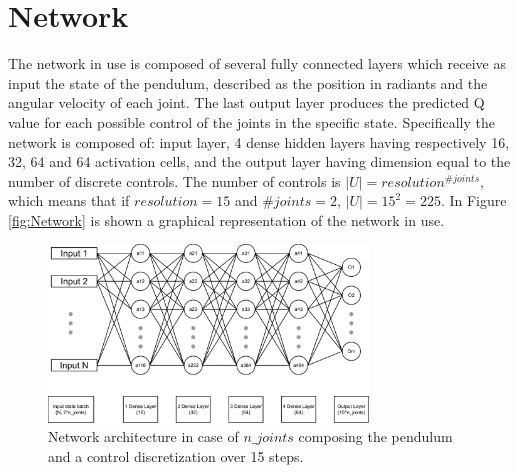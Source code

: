 \documentclass[twocolumn, a4paper]{article}
\begin{document}
\section{Network}
The network in use is composed of several fully connected layers which receive
as input the state of the pendulum, described as the position in
radiants and the angular velocity of each joint.
The last output layer produces the predicted Q value for each possible control
of the joints in the specific state.
Specifically the network is composed of: input layer, 4 dense hidden layers
having respectively 16, 32, 64 and 64 activation cells, and the output layer
having dimension equal to the number of discrete controls.
The number of controls is \(|U|=resolution^{\#joints}\), which
means that if \(resolution=15\) and \(\#joints=2\), \(|U|=15^{2}=225\).
In Figure \ref{fig:Network} is shown a graphical representation of the network
in use.

\label{fig:Network}
\begin{figure}
	\centering
	\includegraphics[width=8.5cm]{"../Figures/Network_schema"}
	\caption{Network architecture in case of $n\_joints$ composing the pendulum
			 and a control discretization over 15 steps.}
\end{figure}
\end{document}
